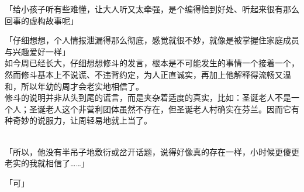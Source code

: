 「给小孩子听有些难懂，让大人听又太牵强，是个编得恰到好处、听起来很有那么回事的虚构故事呢」

「仔细想想，个人情报泄漏得那么彻底，感觉就很不妙，就像是被掌握住家庭成员与兴趣爱好一样」\\

如今周已经长大，仔细想想修斗的发言，根本是不可能发生的事情一个接着一个，然而修斗基本上不说谎、不违背约定，为人正直诚实，再加上他解释得流畅又温和，所以年幼的周才会老实地相信了。\\

修斗的说明并非从头到尾的谎言，而是夹杂着适度的真实，比如：圣诞老人不是一个人；圣诞老人这个非营利团体虽然不存在，但圣诞老人村确实在芬兰。因而它有种奇妙的说服力，让周轻易地就上当了。\\\

「所以，他没有半吊子地敷衍或岔开话题，说得好像真的存在一样，小时候更傻更老实的我就相信了……」

「可」

